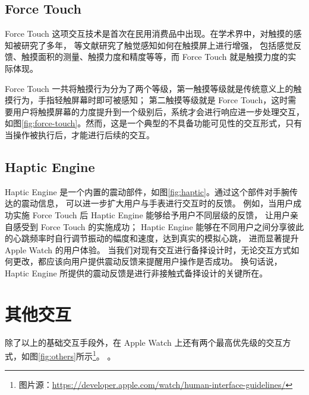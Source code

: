\subsection{Force Touch}

Force Touch 这项交互技术是首次在民用消费品中出现。在学术界中，对触摸的感知被研究了多年，
\cite{Boring:2012ea,Buschek:2015cd,Vogel:2007:STO:1240624.1240727}等文献研究了触觉感知如何在触摸屏上进行增强，
包括感觉反馈、触摸面积的测量、触摸力度和精度等等，而 Force Touch 就是触摸力度的实际体现。

Force Touch 一共将触摸行为分为了两个等级，第一触摸等级就是传统意义上的触摸行为，手指轻触屏幕时即可被感知；
第二触摸等级就是 Force Touch，这时需要用户将触摸屏幕的力度提升到一个级别后，系统才会进行响应进一步处理交互，
如图\ref{fig:force-touch}。然而，这是一个典型的不具备功能可见性的交互形式，只有当操作被执行后，才能进行后续的交互。

\subsection{Haptic Engine}

Haptic Engine 是一个内置的震动部件，如图\ref{fig:haptic}。通过这个部件对手腕传达的震动信息，
可以进一步扩大用户与手表进行交互时的反馈。
例如，当用户成功实施 Force Touch 后 Haptic Engine 能够给予用户不同层级的反馈，
让用户亲自感受到 Force Touch 的实施成功；
Haptic Engine 能够在不同用户之间分享彼此的心跳频率时自行调节振动的幅度和速度，达到真实的模拟心跳，
进而显著提升 Apple Watch 的用户体验。
当我们对现有交互进行备择设计时，无论交互方式如何更改，都应该向用户提供震动反馈来提醒用户操作是否成功。
换句话说，Haptic Engine 所提供的震动反馈是进行非接触式备择设计的关键所在。

\section{其他交互}

除了以上的基础交互手段外，在 Apple Watch 上还有两个最高优先级的交互方式，如图\ref{fig:others}所示\footnote{图片源：\url{https://developer.apple.com/watch/human-interface-guidelines/}}。
。

